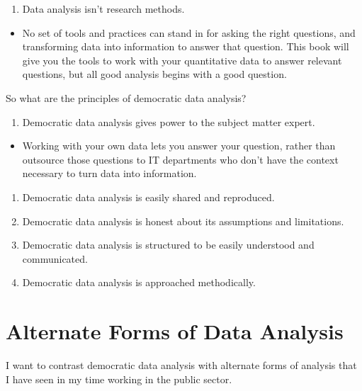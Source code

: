 \documentclass[]{book}
\providecommand{\tightlist}{%
  \setlength{\itemsep}{0pt}\setlength{\parskip}{0pt}}
\begin{document}
\begin{enumerate}
\def\labelenumi{\arabic{enumi}.}
\setcounter{enumi}{2}
\tightlist
\item
  Data analysis isn't research methods.
\end{enumerate}

\begin{itemize}
\tightlist
\item
  No set of tools and practices can stand in for asking the right
  questions, and transforming data into information to answer that
  question. This book will give you the tools to work with your
  quantitative data to answer relevant questions, but all good analysis
  begins with a good question.
\end{itemize}

So what are the principles of democratic data analysis?

\begin{enumerate}
\def\labelenumi{\arabic{enumi}.}
\tightlist
\item
  Democratic data analysis gives power to the subject matter expert.
\end{enumerate}

\begin{itemize}
\tightlist
\item
  Working with your own data lets you answer your question, rather than
  outsource those questions to IT departments who don't have the context
  necessary to turn data into information.
\end{itemize}

\begin{enumerate}
\def\labelenumi{\arabic{enumi}.}
\setcounter{enumi}{1}
\tightlist
\item
  Democratic data analysis is easily shared and reproduced.
\item
  Democratic data analysis is honest about its assumptions and
  limitations.
\item
  Democratic data analysis is structured to be easily understood and
  communicated.
\item
  Democratic data analysis is approached methodically.
\end{enumerate}

\section{Alternate Forms of Data
Analysis}\label{alternate-forms-of-data-analysis}

I want to contrast democratic data analysis with alternate forms of
analysis that I have seen in my time working in the public sector.
\end{document}
